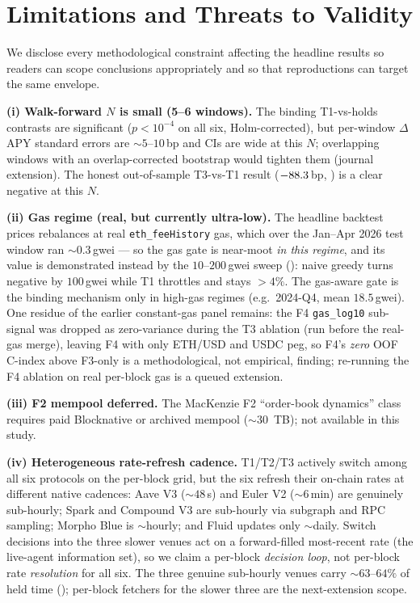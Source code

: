 
\section{Limitations and Threats to Validity}
\label{sec:limitations}

We disclose every methodological constraint affecting the headline
results so readers can scope conclusions appropriately and so that
reproductions can target the same envelope.

\textbf{(i) Walk-forward $N$ is small (5--6 windows).}  The binding
T1-vs-holds contrasts are significant ($p<10^{-4}$ on all six,
Holm-corrected), but
per-window $\Delta$APY standard errors are $\sim 5$--$10$\,bp and
CIs are wide at this $N$; overlapping windows with an
overlap-corrected bootstrap would tighten them (journal extension).
The honest out-of-sample T3-vs-T1 result ($-88.3$\,bp,
) is a clear negative at this $N$.

\textbf{(ii) Gas regime (real, but currently ultra-low).}  The
headline backtest prices rebalances at real \texttt{eth\_feeHistory}
gas, which over the Jan--Apr 2026 test window ran $\sim 0.3$\,gwei
--- so the gas gate is near-moot \emph{in this regime}, and its value
is demonstrated instead by the $10$--$200$\,gwei sweep
(): naive greedy turns negative by $100$\,gwei
while T1 throttles and stays $>4\%$. The gas-aware gate is the
binding mechanism only in high-gas regimes (e.g.\ 2024-Q4, mean
$18.5$\,gwei). One residue of the earlier constant-gas panel
remains: the F4 \texttt{gas\_log10} sub-signal was dropped as
zero-variance during the T3 ablation (run before the real-gas
merge), leaving F4 with only ETH/USD and USDC peg, so F4's
\emph{zero} OOF C-index above F3-only is a methodological, not
empirical, finding; re-running the F4 ablation on real per-block gas
is a queued extension.

\textbf{(iii) F2 mempool deferred.}  The MacKenzie F2
``order-book dynamics'' class requires paid Blocknative or
archived mempool ($\sim 30$~TB); not available in this study.

\textbf{(iv) Heterogeneous rate-refresh cadence.}  T1/T2/T3 actively
switch among all six protocols on the per-block grid, but the six
refresh their on-chain rates at different native cadences: Aave V3
($\sim 48$\,s) and Euler V2 ($\sim 6$\,min) are genuinely
sub-hourly; Spark and Compound V3 are sub-hourly via subgraph and
RPC sampling; Morpho Blue is $\sim$hourly; and Fluid updates only
$\sim$daily.  Switch decisions into the three slower venues act on a
forward-filled most-recent rate (the live-agent information set), so
we claim a per-block \emph{decision loop}, not per-block rate
\emph{resolution} for all six.  The three genuine sub-hourly venues
carry $\sim 63$--$64\%$ of held time ();
per-block fetchers for the slower three are the next-extension scope.


